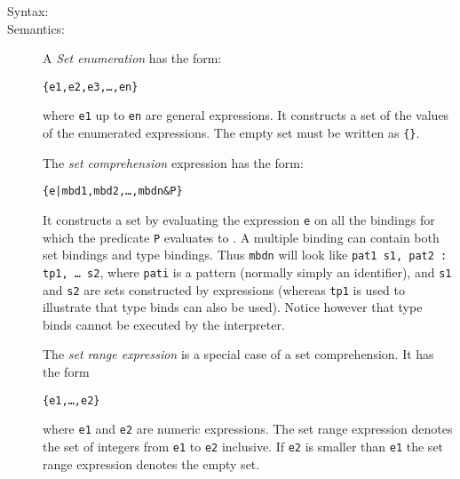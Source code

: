 \documentclass[\pformat,12pt]{article}
\begin{document}
\begin{description}
\item[Syntax:]
  




\item[Semantics:] A {\it Set enumeration} has the form:
  \begin{alltt}
    \{e1, e2, e3, \ldots, en\}
  \end{alltt}
  where {\tt e1} up to {\tt en} are general expressions. It constructs
  a set of the values of the enumerated expressions. The empty set
  must be written as \verb+{}+.

  The {\it set comprehension} expression has the form:
  \begin{alltt}
    \{e | mbd1, mbd2, \ldots, mbdn \& P\}
  \end{alltt}
  It constructs a set by evaluating the expression {\tt e} on all the
  bindings for which the predicate {\tt P} evaluates to . A
  multiple binding can contain both set bindings and type bindings.
  Thus {\tt mbdn} will look like {\tt pat1  s1, pat2 : tp1,
    \ldots {} s2}, where {\tt pati} is a pattern (normally
  simply an identifier), and {\tt s1} and {\tt s2} are sets
  constructed by expressions (whereas {\tt tp1} is used to illustrate
  that type binds can also be used). Notice however that type binds
  cannot be executed by the interpreter.

  The {\it set range expression} is a special case of a set
  comprehension. It has the form
  \begin{alltt}
    \{e1, \ldots, e2\}
  \end{alltt}
  where {\tt e1} and {\tt e2} are numeric expressions. The set range
  expression denotes the set of integers from {\tt e1} to {\tt e2}
  inclusive. If {\tt e2} is smaller than {\tt e1} the set range
  expression denotes the empty set. 


\end{description}
\end{document}
